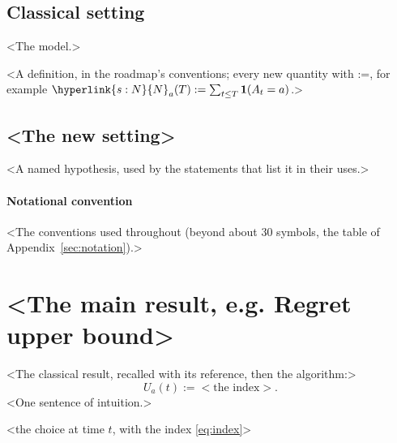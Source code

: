 \documentclass[11pt]{article}
\newcommand{\dt}[1]{\hypertarget{#1}{}}
\newcommand{\sy}[2]{\hyperlink{#1}{#2}}
\newcommand{\N}{\sy{s:N}{N}}
\begin{document}
\subsection{Classical setting}

<The model.>

\begin{definition}[<Name>]\label{def:example}
<A definition, in the roadmap's conventions; every new quantity with :=, for example
\dt{s:N}$\N_a(T) := \sum_{t\le T}\mathbf 1(A_t = a)$.>
\end{definition}

\subsection{<The new setting>}

\begin{assumption}[<Name>]\label{ass:example}
<A named hypothesis, used by the statements that list it in their uses.>
\end{assumption}

\paragraph{Notational convention} <The conventions used throughout (beyond about 30 symbols, the
table of Appendix~\ref{sec:notation}).>

\section{<The main result, e.g. Regret upper bound>}\label{sec:main}

<The classical result, recalled with its reference, then the algorithm:>
\begin{equation}\label{eq:index}
  U_a(t) := <\text{the index}>.
\end{equation}
<One sentence of intuition.>

\begin{algorithm}[t]
\caption{\texttt{<Name of the algorithm>}}\label{alg:example}
\begin{algorithmic}[1]
  \State <the choice at time $t$, with the index \eqref{eq:index}>
\EndFor
\end{algorithmic}
\end{algorithm}
\end{document}
